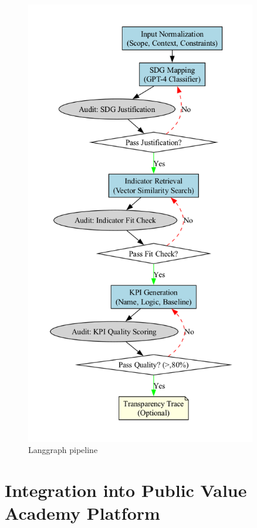 \begin{figure}[H]
    \centering
    \includegraphics[width=0.9\textwidth]{../fig/langgraph_pipeline}
    \caption{Langgraph pipeline}
    \label{fig:langgraph-pipeline}
\end{figure}

\section{Integration into Public Value Academy Platform}\label{sec:integration-into-public-value-academy-platform}

